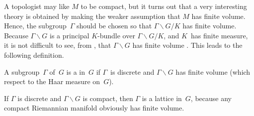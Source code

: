A topologist may like $M$ to be compact, but it turns out that a
very interesting theory is obtained by making the weaker assumption
that $M$ has finite volume. Hence, the subgroup~$\Gamma$ should be
chosen so that $\Gamma \backslash G/K$ has finite volume. Because
$\Gamma \backslash G$ is a principal $K$-bundle over $\Gamma
\backslash G/K$, and $K$~has finite measure, it is not difficult to
see, from , that $\Gamma \backslash G$ has finite
volume . This leads to the following
definition.

\begin{defn}
 A subgroup~$\Gamma$ of~$G$ is a  in~$G$ if $\Gamma$~is discrete and $\Gamma \backslash G$ has finite volume
\textup(which respect to the Haar measure on~$G$\textup). 
 \end{defn}

\begin{eg}
If $\Gamma$ is discrete and $\Gamma
\backslash G$ is compact, then $\Gamma$ is a lattice in~$G$, because
any compact Riemannian manifold obviously has finite volume.
\end{eg}

